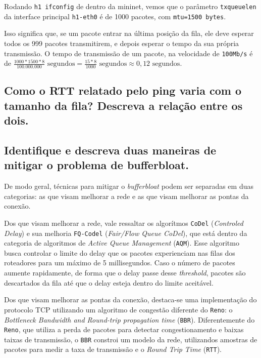 \documentclass[a4paper,12pt]{article}
\newcommand{\code}[1]{\texttt{#1}}
\begin{document}
Rodando \code{h1 ifconfig} de dentro da mininet, vemos que o parâmetro \code{txqueuelen} da interface principal \code{h1-eth0} é de 1000 pacotes, com \code{mtu=1500 bytes}.

Isso significa que, se um pacote entrar na última posição da fila, ele deve esperar todos os 999 pacotes transmitirem, e depois esperar o tempo da sua própria transmissão. O tempo de transmissão de um pacote, na velocidade de \code{100Mb/s} é de $\frac{1000 * 1500 * 8}{100.000.000} \text{ segundos} = \frac{15 * 8}{1000} \text{ segundos} \approx 0,12 \text{ segundos} $. 

\subsection{Como o RTT relatado pelo ping varia com o tamanho da fila? Descreva a relação entre os dois.}

\subsection{Identifique e descreva duas maneiras de mitigar o problema de bufferbloat.}

De modo geral, técnicas para mitigar o \textit{bufferbloat} podem ser separadas em duas categorias: as que visam melhorar a rede e as que visam melhorar as pontas da conexão.

Dos que visam melhorar a rede, vale ressaltar os algorítmos \code{CoDel} (\textit{Controled Delay}) e sua melhoria \code{FQ-Codel} (\textit{Fair/Flow Queue CoDel}), que está dentro da categoria de algoritmos de \textit{Active Queue Management} (\code{AQM}). Esse algoritmo busca controlar o limite do delay que os pacotes experienciam nas filas dos roteadores para um máximo de 5 millisegundos. Caso o número de pacotes aumente rapidamente, de forma que o delay passe desse \textit{threshold}, pacotes são descartados da fila até que o delay esteja dentro do limite aceitável.

Dos que visam melhorar as pontas da conexão, destaca-se uma implementação do protocolo TCP utilizando um algoritmo de congestão diferente do \code{Reno}: o \textit{Bottleneck Bandwidth and Round-trip propagation time} (\code{BBR}). Diferentemente do \code{Reno}, que utiliza a perda de pacotes para detectar congestionamento e baixas taixas de transmissão, o \code{BBR} constroi um modelo da rede, utilizandos amostras de pacotes para medir a taxa de transmissão e o \textit{Round Trip Time} (\code{RTT}).

\end{document}
